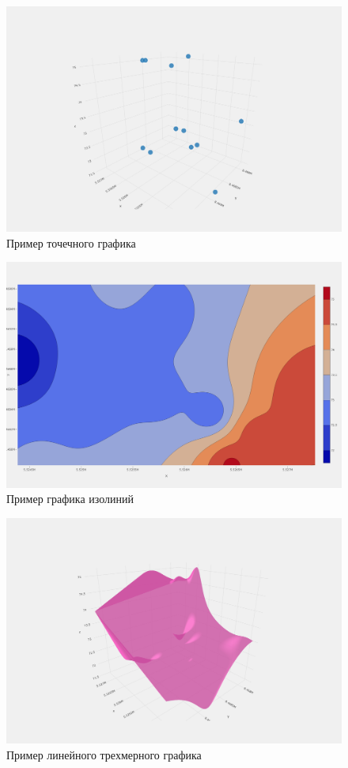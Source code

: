 \begin{figure}[h!]
    \center
    \includegraphics[scale=0.3]{fig/newplot (9).png}
    \caption{Пример точечного графика}
    \label{fig:17}
\end{figure}
\begin{figure}[h!]
    \center
    \includegraphics[scale=0.3]{fig/newplot (10).png}
    \caption{Пример графика изолиний}
    \label{fig:18}
\end{figure}
\begin{figure}[h!]
    \center
    \includegraphics[scale=0.3]{fig/newplot (11).png}
    \caption{Пример линейного трехмерного графика}
    \label{fig:19}
\end{figure}
